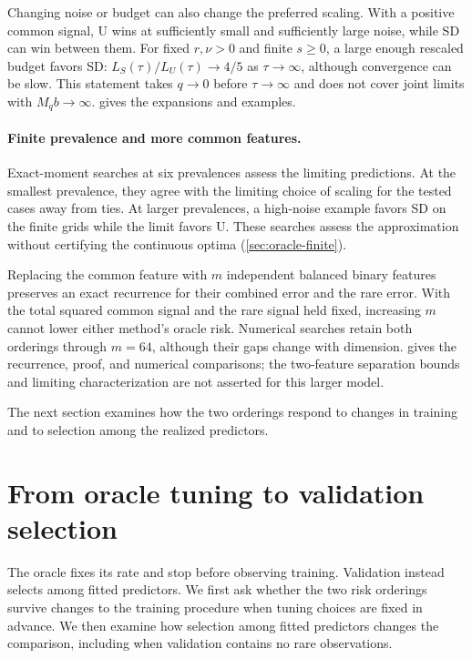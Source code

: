 \documentclass{alt2027}
\begin{document}
Changing noise or budget can also change the preferred scaling. With a positive
common signal, U wins at sufficiently small and sufficiently large noise, while
SD can win between them. For fixed $r,\nu > 0$ and finite $s \geq 0$, a large
enough rescaled budget favors SD: $L_S(\tau)/L_U(\tau) \to 4/5$ as
$\tau \to \infty$, although convergence can be slow. This statement takes
$q \to 0$ before $\tau \to \infty$ and does not cover joint limits with
$M_qb \to \infty$.  gives the expansions and
examples.

\paragraph{Finite prevalence and more common features.}

Exact-moment searches at six prevalences assess the limiting predictions. At the
smallest prevalence, they agree with the limiting choice of scaling for the
tested cases away from ties. At larger prevalences, a high-noise example favors
SD on the finite grids while the limit favors U. These searches assess the
approximation without certifying the continuous optima
(\cref{sec:oracle-finite}).

Replacing the common feature with $m$ independent balanced binary features
preserves an exact recurrence for their combined error and the rare error. With
the total squared common signal and the rare signal held fixed, increasing $m$
cannot lower either method's oracle risk. Numerical searches retain both
orderings through $m = 64$, although their gaps change with dimension.
 gives the recurrence, proof, and numerical
comparisons; the two-feature separation bounds and limiting characterization are
not asserted for this larger model.

The next section examines how the two orderings respond to changes in training
and to selection among the realized predictors.

\section{From oracle tuning to validation selection}

The oracle fixes its rate and stop before observing training. Validation instead
selects among fitted predictors. We first ask whether the two risk orderings
survive changes to the training procedure when tuning choices are fixed in
advance. We then examine how selection among fitted predictors changes the
comparison, including when validation contains no rare observations.
\end{document}
